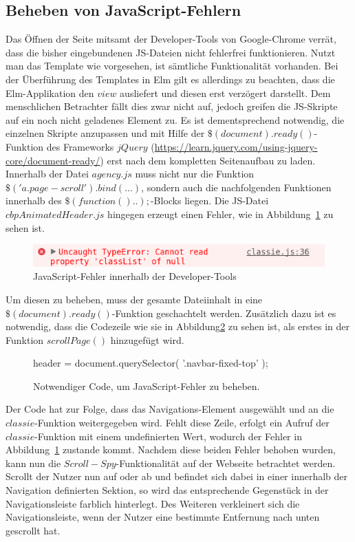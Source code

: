 \subsection{Beheben von JavaScript-Fehlern}
\label{sec:javascript-errors}
Das Öffnen der Seite mitsamt der Developer-Tools von Google-Chrome verrät, dass die bisher eingebundenen \ac{JS}-Dateien nicht fehlerfrei funktionieren. Nutzt man das Template wie vorgesehen, ist sämtliche Funktionalität vorhanden. Bei der Überführung des Templates in Elm gilt es allerdings zu beachten, dass die Elm-Applikation den $view$ ausliefert und diesen erst verzögert darstellt. Dem menschlichen Betrachter fällt dies zwar nicht auf, jedoch greifen die \ac{JS}-Skripte auf ein noch nicht geladenes Element zu. Es ist dementsprechend notwendig, die einzelnen Skripte anzupassen und mit Hilfe der $\$(document).ready()$-Funktion des Frameworks $jQuery$ (\url{https://learn.jquery.com/using-jquery-core/document-ready/}) erst nach dem kompletten Seitenaufbau zu laden.
Innerhalb der Datei $agency.js$ muss nicht nur die Funktion $\$('a.page-scroll').bind(...)$, sondern auch die nachfolgenden Funktionen innerhalb des $\$(function(){..});$-Blocks liegen. Die \ac{JS}-Datei $cbpAnimatedHeader.js$ hingegen erzeugt einen Fehler, wie in Abbildung~\ref{fig:js-classie-error} zu sehen ist.
\begin{figure}[h]
\centering
\includegraphics[scale=0.4]{img/error-javascript-classie.png}
\caption{JavaScript-Fehler innerhalb der Developer-Tools}\label{fig:js-classie-error}
\end{figure}
Um diesen zu beheben, muss der gesamte Dateiinhalt in eine $\$(document).ready()$-Funktion geschachtelt werden. Zusätzlich dazu ist es notwendig, dass die Codezeile wie sie in Abbildung\ref{fig:code-to-add} zu sehen ist, als erstes in der Funktion $scrollPage()$ hinzugefügt wird.
\begin{figure}[h]
\centering
header = document.querySelector( '.navbar-fixed-top' );
\caption{Notwendiger Code, um JavaScript-Fehler zu beheben.}\label{fig:code-to-add}
\end{figure}
Der Code hat zur Folge, dass das Navigations-Element ausgewählt und an die $classie$-Funktion weitergegeben wird. Fehlt diese Zeile, erfolgt ein Aufruf der $classie$-Funktion mit einem undefinierten Wert, wodurch der Fehler in Abbildung~\ref{fig:js-classie-error} zustande kommt. Nachdem diese beiden Fehler behoben wurden, kann nun die $Scroll-Spy$-Funktionalität auf der Webseite betrachtet werden. Scrollt der Nutzer nun auf oder ab und befindet sich dabei in einer innerhalb der Navigation definierten Sektion, so wird das entsprechende Gegenstück in der Navigationsleiste farblich hinterlegt. Des Weiteren verkleinert sich die Navigationsleiste, wenn der Nutzer eine bestimmte Entfernung nach unten gescrollt hat.
